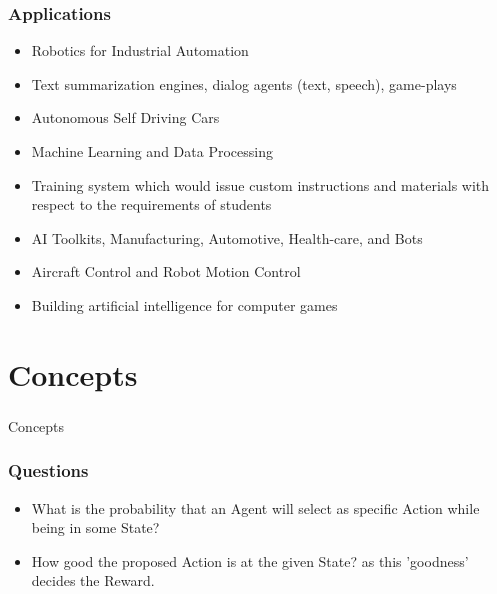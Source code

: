 \begin{frame}[fragile]\frametitle{Applications}

\begin{itemize}
\item Robotics for Industrial Automation
\item Text summarization engines, dialog agents (text, speech), game-plays
\item Autonomous Self Driving Cars
\item Machine Learning and Data Processing
\item Training system which would issue custom instructions and materials with respect to the requirements of students
\item AI Toolkits, Manufacturing, Automotive, Health-care, and Bots
\item Aircraft Control and Robot Motion Control
\item Building artificial intelligence for computer games
\end{itemize}

\end{frame}



\section[Concepts]{Concepts}

\begin{frame}[fragile]\frametitle{}
\begin{center}
{\Large Concepts}
\end{center}
\end{frame}


\begin{frame}[fragile]\frametitle{Questions}

\begin{itemize}
\item What is the probability that an Agent will select as specific Action while being in some State?
\item How good the proposed Action is at the given State? as this 'goodness' decides the Reward.
\end{itemize}

\end{frame}

